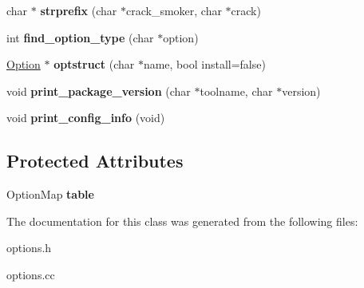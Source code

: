 \begin{DoxyCompactItemize}
\item 
\hypertarget{classOptions_a1273ec7b1f585443952d3d43feec0010}{
char $\ast$ {\bfseries strprefix} (char $\ast$crack\_\-smoker, char $\ast$crack)}
\label{classOptions_a1273ec7b1f585443952d3d43feec0010}

\item 
\hypertarget{classOptions_a43c1b070c853edd7d3b227e300f6db80}{
int {\bfseries find\_\-option\_\-type} (char $\ast$option)}
\label{classOptions_a43c1b070c853edd7d3b227e300f6db80}

\item 
\hypertarget{classOptions_a4a9be4a96d5b12a8abb469fef02af7ee}{
\hyperlink{structOption}{Option} $\ast$ {\bfseries optstruct} (char $\ast$name, bool install=false)}
\label{classOptions_a4a9be4a96d5b12a8abb469fef02af7ee}

\item 
\hypertarget{classOptions_a11e86765e4e309f8eb0abef4f235d106}{
void {\bfseries print\_\-package\_\-version} (char $\ast$toolname, char $\ast$version)}
\label{classOptions_a11e86765e4e309f8eb0abef4f235d106}

\item 
\hypertarget{classOptions_ac6c9b11dab112ef2647386e45da45bb0}{
void {\bfseries print\_\-config\_\-info} (void)}
\label{classOptions_ac6c9b11dab112ef2647386e45da45bb0}

\end{DoxyCompactItemize}
\subsection*{Protected Attributes}
\begin{DoxyCompactItemize}
\item 
\hypertarget{classOptions_a9c57c93eb164dd69a2c63c8d86f90ab2}{
OptionMap {\bfseries table}}
\label{classOptions_a9c57c93eb164dd69a2c63c8d86f90ab2}

\end{DoxyCompactItemize}


The documentation for this class was generated from the following files:\begin{DoxyCompactItemize}
\item 
options.h\item 
options.cc\end{DoxyCompactItemize}

